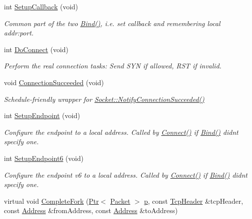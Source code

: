 \begin{DoxyCompactItemize}
int \hyperlink{classns3_1_1TcpSocketBase_a18a50820f806878422527d507268c4ac}{Setup\+Callback} (void)
\begin{DoxyCompactList}\small\item\em Common part of the two \hyperlink{classns3_1_1TcpSocketBase_a7a9a87b74c1ce59ac89df8d9221681dd}{Bind()}, i.\+e. set callback and remembering local addr\+:port. \end{DoxyCompactList}\item 
int \hyperlink{classns3_1_1TcpSocketBase_ac07945f77be2c49f0c1712ea56322493}{Do\+Connect} (void)
\begin{DoxyCompactList}\small\item\em Perform the real connection tasks\+: Send S\+YN if allowed, R\+ST if invalid. \end{DoxyCompactList}\item 
void \hyperlink{classns3_1_1TcpSocketBase_a324311b484cc258ae61fbd7bcfbeeb7e}{Connection\+Succeeded} (void)
\begin{DoxyCompactList}\small\item\em Schedule-\/friendly wrapper for \hyperlink{classns3_1_1Socket_a2f55d195304131b356818bc74134c5a7}{Socket\+::\+Notify\+Connection\+Succeeded()} \end{DoxyCompactList}\item 
int \hyperlink{classns3_1_1TcpSocketBase_aa1e2094be5e9653b9d8d8d76b7ec670f}{Setup\+Endpoint} (void)
\begin{DoxyCompactList}\small\item\em Configure the endpoint to a local address. Called by \hyperlink{classns3_1_1TcpSocketBase_aabd08c9eb0ee3c88c855eb7268e392bf}{Connect()} if \hyperlink{classns3_1_1TcpSocketBase_a7a9a87b74c1ce59ac89df8d9221681dd}{Bind()} didn\textquotesingle{}t specify one. \end{DoxyCompactList}\item 
int \hyperlink{classns3_1_1TcpSocketBase_afe98eecb266502ddd1fdbcfa37442b7a}{Setup\+Endpoint6} (void)
\begin{DoxyCompactList}\small\item\em Configure the endpoint v6 to a local address. Called by \hyperlink{classns3_1_1TcpSocketBase_aabd08c9eb0ee3c88c855eb7268e392bf}{Connect()} if \hyperlink{classns3_1_1TcpSocketBase_a7a9a87b74c1ce59ac89df8d9221681dd}{Bind()} didn\textquotesingle{}t specify one. \end{DoxyCompactList}\item 
virtual void \hyperlink{classns3_1_1TcpSocketBase_abba7d4c43acb3f9356e348b970a882fb}{Complete\+Fork} (\hyperlink{classns3_1_1Ptr}{Ptr}$<$ \hyperlink{classns3_1_1Packet}{Packet} $>$ \hyperlink{lte__link__budget__x2__handover__measures_8m_ac9de518908a968428863f829398a4e62}{p}, const \hyperlink{classns3_1_1TcpHeader}{Tcp\+Header} \&tcp\+Header, const \hyperlink{classns3_1_1Address}{Address} \&from\+Address, const \hyperlink{classns3_1_1Address}{Address} \&to\+Address)

\end{DoxyCompactItemize}

